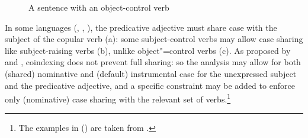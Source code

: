 \begin{figure}
\caption{\label{cons3}A sentence with an object-control verb}
\end{figure}

In some  languages (, , ), the predicative adjective must share case with the subject of the copular verb (a): some subject-control
verbs may allow case sharing like subject-raising verbs (b), unlike object"=control verbs (c).
As proposed by \citet{Przepiorkowski2004} and
\citet{PrzepiorkowskiandRosen2005}, coindexing does not prevent full sharing: so the analysis may
allow for both (shared) nominative and (default) instrumental case for the unexpressed subject and the predicative adjective, and a specific constraint may be added to enforce only (nominative) case sharing with the relevant set of verbs.\footnote{%
   The examples in () are taken from .
}

